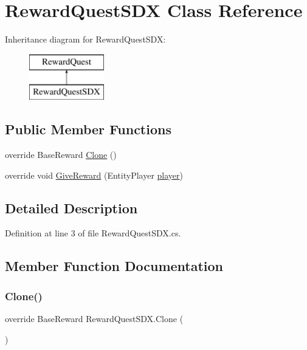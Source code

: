 \hypertarget{class_reward_quest_s_d_x}{}\section{Reward\+Quest\+S\+DX Class Reference}
\label{class_reward_quest_s_d_x}
Inheritance diagram for Reward\+Quest\+S\+DX\+:\begin{figure}[H]
\begin{center}
\leavevmode
\includegraphics[height=2.000000cm]{class_reward_quest_s_d_x}
\end{center}
\end{figure}
\subsection*{Public Member Functions}
\begin{DoxyCompactItemize}
\item 
override Base\+Reward \mbox{\hyperlink{class_reward_quest_s_d_x_ae428dcf77db8c60a25f0b30aa9619c2a}{Clone}} ()
\item 
override void \mbox{\hyperlink{class_reward_quest_s_d_x_ae711090cc0e58e20e0b8c92e4a380fe7}{Give\+Reward}} (Entity\+Player \mbox{\hyperlink{_sphere_i_i_01_music_01_boxes_2_config_2_localization_8txt_a4e2cb8aeff651600ea1cc57fe5a929a4}{player}})
\end{DoxyCompactItemize}


\subsection{Detailed Description}


Definition at line 3 of file Reward\+Quest\+S\+D\+X.\+cs.



\subsection{Member Function Documentation}
\mbox{\label{class_reward_quest_s_d_x_ae428dcf77db8c60a25f0b30aa9619c2a}} 
\subsubsection{\texorpdfstring{Clone()}{Clone()}}
{\footnotesize\ttfamily override Base\+Reward Reward\+Quest\+S\+D\+X.\+Clone (\begin{DoxyParamCaption}{ }\end{DoxyParamCaption})}



